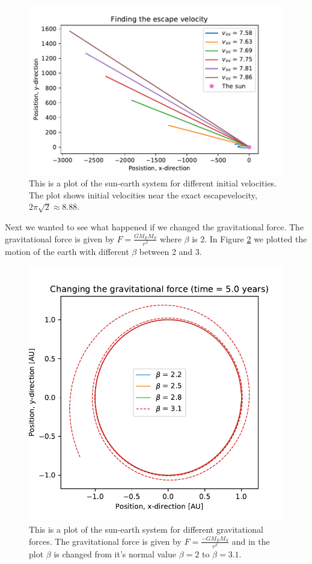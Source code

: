 \begin{figure}[H]
\includegraphics[width=0.9\linewidth]{../results/plots/escape_velocity_closeto_exact.pdf}\caption{This is a plot of the sun-earth system for different initial velocities. The plot shows initial velocities near the exact escapevelocity, $2\pi\sqrt{2} \approx 8.88 $. }\label{fig:escape_velocity_near_exact}
\end{figure}

Next we wanted to see what happened if we changed the gravitational force. The gravitational force is given by $ F = \frac{GM_EM_S}{r^\beta}$ where $\beta$ is 2. In Figure \ref{fig:different_gravitation} we plotted the motion of the earth with different $\beta$ between 2 and 3.

\begin{figure}[H]
\includegraphics[width=0.9\linewidth]{../results/plots/diffenrent_gravitation.pdf}\caption{This is a plot of the sun-earth system for different gravitational forces. The gravitational force is given by $ F = \frac{-GM_EM_S}{r^\beta}$ and in the plot $\beta$ is changed from it's normal value $\beta = 2$ to $\beta = 3.1$.}\label{fig:different_gravitation}
\end{figure}

